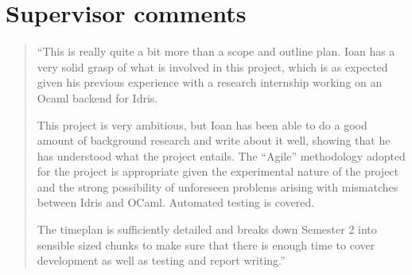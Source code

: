 \documentclass[a4paper, 12pt, oneside]{report}
\begin{document}
\section{Supervisor comments}

\begin{quote}
``This is really quite a bit more than a scope and outline plan. Ioan
has a very solid grasp of what is involved in this project, which is
as expected given his previous experience with a research internship
working on an Ocaml backend for Idris.

This project is very ambitious, but Ioan has been able to do a good
amount of background research and write about it well, showing that he
has understood what the project entails. The ``Agile'' methodology
adopted for the project is appropriate given the experimental nature
of the project and the strong possibility of unforeseen problems
arising with mismatches between Idris and OCaml. Automated testing is
covered.

The timeplan is sufficiently detailed and breaks down Semester 2 into
sensible sized chunks to make sure that there is enough time to cover
development as well as testing and report writing.''
\end{quote}







\end{document}
